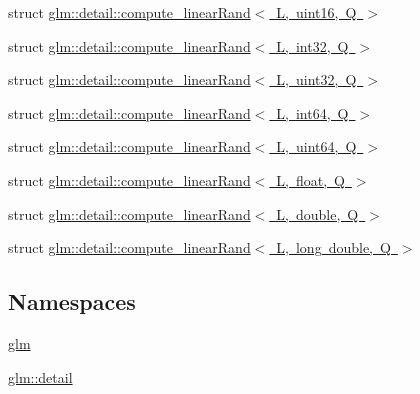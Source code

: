 \begin{DoxyCompactItemize}
struct \mbox{\hyperlink{structglm_1_1detail_1_1compute__linear_rand_3_01_l_00_01uint16_00_01_q_01_4}{glm\+::detail\+::compute\+\_\+linear\+Rand$<$ L, uint16, Q $>$}}
\item 
struct \mbox{\hyperlink{structglm_1_1detail_1_1compute__linear_rand_3_01_l_00_01int32_00_01_q_01_4}{glm\+::detail\+::compute\+\_\+linear\+Rand$<$ L, int32, Q $>$}}
\item 
struct \mbox{\hyperlink{structglm_1_1detail_1_1compute__linear_rand_3_01_l_00_01uint32_00_01_q_01_4}{glm\+::detail\+::compute\+\_\+linear\+Rand$<$ L, uint32, Q $>$}}
\item 
struct \mbox{\hyperlink{structglm_1_1detail_1_1compute__linear_rand_3_01_l_00_01int64_00_01_q_01_4}{glm\+::detail\+::compute\+\_\+linear\+Rand$<$ L, int64, Q $>$}}
\item 
struct \mbox{\hyperlink{structglm_1_1detail_1_1compute__linear_rand_3_01_l_00_01uint64_00_01_q_01_4}{glm\+::detail\+::compute\+\_\+linear\+Rand$<$ L, uint64, Q $>$}}
\item 
struct \mbox{\hyperlink{structglm_1_1detail_1_1compute__linear_rand_3_01_l_00_01float_00_01_q_01_4}{glm\+::detail\+::compute\+\_\+linear\+Rand$<$ L, float, Q $>$}}
\item 
struct \mbox{\hyperlink{structglm_1_1detail_1_1compute__linear_rand_3_01_l_00_01double_00_01_q_01_4}{glm\+::detail\+::compute\+\_\+linear\+Rand$<$ L, double, Q $>$}}
\item 
struct \mbox{\hyperlink{structglm_1_1detail_1_1compute__linear_rand_3_01_l_00_01long_01double_00_01_q_01_4}{glm\+::detail\+::compute\+\_\+linear\+Rand$<$ L, long double, Q $>$}}
\end{DoxyCompactItemize}
\subsection*{Namespaces}
\begin{DoxyCompactItemize}
\item 
 \mbox{\hyperlink{namespaceglm}{glm}}
\item 
 \mbox{\hyperlink{namespaceglm_1_1detail}{glm\+::detail}}
\end{DoxyCompactItemize}
